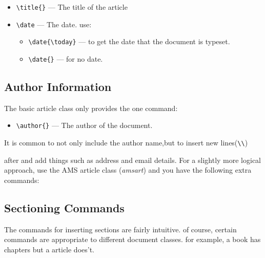 \documentclass{article}
\begin{document}
\begin{itemize}
\item \verb|\title{}| --- The title of the article
\item \verb|\date| --- The date. use:
  \begin{itemize}
  \item \verb|\date{\today}| --- to get the date that the document is typeset.
  \item \verb|\date{}| --- for no date.
  \end{itemize}

\end{itemize}

\subsection{Author Information}
\label{sec:info}

The basic article class only provides the one command:
\begin{itemize}
\item \verb|\author{}| --- The author of the document.
\end{itemize}

It is common to not only include the author name,but to insert new lines(\verb|\\|)

after and add things such as address and email details. For a slightly more logical
approach, use the AMS article class (\emph{amsart}) and you have the following extra
commands:


\subsection{Sectioning Commands}
\label{sec:info}

The commands for inserting sections are fairly intuitive. of course,
certain commands are appropriate to different document classes.
for example, a book has chapters but a article does't.
\end{document}
